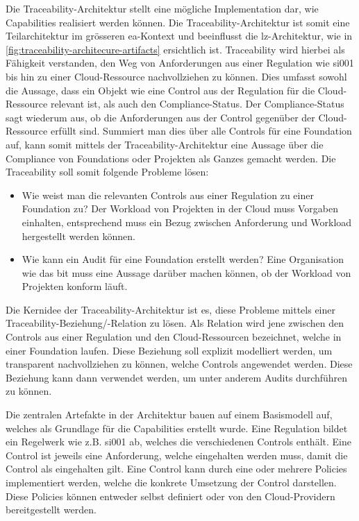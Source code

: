 Die Traceability-Architektur stellt eine mögliche Implementation dar, wie Capabilities realisiert werden können. Die Traceability-Architektur ist somit eine Teilarchitektur im grösseren \ac{ea}-Kontext und beeinflusst die \ac{lz}-Architektur, wie in \autoref{fig:traceability-architecure-artifacts} ersichtlich ist. Traceability wird hierbei als Fähigkeit verstanden, den Weg von Anforderungen aus einer Regulation wie \ac{si001} bis hin zu einer Cloud-Ressource nachvollziehen zu können. Dies umfasst sowohl die Aussage, dass ein Objekt wie eine Control aus der Regulation für die Cloud-Ressource relevant ist, als auch den Compliance-Status. Der Compliance-Status sagt wiederum aus, ob die Anforderungen aus der Control gegenüber der Cloud-Ressource erfüllt sind. Summiert man dies über alle Controls für eine Foundation auf, kann somit mittels der Traceability-Architektur eine Aussage über die Compliance von Foundations oder Projekten als Ganzes gemacht werden. Die Traceability soll somit folgende Probleme lösen:

\begin{itemize}
    \item Wie weist man die relevanten Controls aus einer Regulation zu einer Foundation zu? Der Workload von Projekten in der Cloud muss Vorgaben einhalten, entsprechend muss ein Bezug zwischen Anforderung und Workload hergestellt werden können.
    \item Wie kann ein Audit für eine Foundation erstellt werden? Eine Organisation wie das \ac{bit} muss eine Aussage darüber machen können, ob der Workload von Projekten konform läuft.
\end{itemize}

Die Kernidee der Traceability-Architektur ist es, diese Probleme mittels einer Traceability-Beziehung/-Relation zu lösen. Als Relation wird jene zwischen den Controls aus einer Regulation und den Cloud-Ressourcen bezeichnet, welche in einer Foundation laufen. Diese Beziehung soll explizit modelliert werden, um transparent nachvollziehen zu können, welche Controls angewendet werden. Diese Beziehung kann dann verwendet werden, um unter anderem Audits durchführen zu können.

Die zentralen Artefakte in der Architektur bauen auf einem Basismodell auf, welches als Grundlage für die Capabilities erstellt wurde. Eine Regulation bildet ein Regelwerk wie z.B. \ac{si001} ab, welches die verschiedenen Controls enthält. Eine Control ist jeweils eine Anforderung, welche eingehalten werden muss, damit die Control als eingehalten gilt. Eine Control kann durch eine oder mehrere Policies implementiert werden, welche die konkrete Umsetzung der Control darstellen. Diese Policies können entweder selbst definiert oder von den Cloud-Providern bereitgestellt werden.

